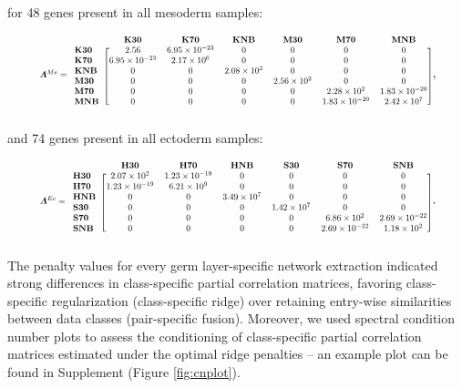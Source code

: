 \documentclass[
	a4paper, %
	10pt, %
	unnumberedsections, %
	twoside, %
]{LTJournalArticle}
\begin{document}
\noindent for 48 genes present in all mesoderm samples:

\[
\resizebox{0.9\columnwidth}{!}{
	$\bm{\varLambda}^{Me} = 
    \begin{blockarray}{l*{6}{c}}
     & \mathbf{K30} & \mathbf{K70} & \mathbf{KNB} & \mathbf{M30} & \mathbf{M70} & \mathbf{MNB} \\
    \begin{block}{l[cccccc]}
    \mathbf{K30} & 2.56 & 6.95 \times 10^{-23} & 0 & 0 & 0 & 0 \\
    \mathbf{K70} & 6.95 \times 10^{-23} & 2.17 \times 10^{6} & 0 & 0 & 0 & 0 \\
    \mathbf{KNB} & 0 & 0 & 2.08 \times 10^{2} & 0 & 0 & 0 \\
    \mathbf{M30} & 0 & 0 & 0 & 2.56 \times 10^{2} & 0 & 0 \\
    \mathbf{M70} & 0 & 0 & 0 & 0 & 2.28 \times 10^{2} & 1.83 \times 10^{-20} \\
    \mathbf{MNB} & 0 & 0 & 0 & 0 & 1.83 \times 10^{-20} & 2.42 \times 10^{7} \\
    \end{block}
    \end{blockarray}$},
\]

\noindent and 74 genes present in all ectoderm samples:

\[
\resizebox{0.9\columnwidth}{!}{
	$\bm{\varLambda}^{Ec} = 
    \begin{blockarray}{l*{6}{c}}
     & \mathbf{H30} & \mathbf{H70} & \mathbf{HNB} & \mathbf{S30} & \mathbf{S70} & \mathbf{SNB} \\
    \begin{block}{l[cccccc]}
    \mathbf{H30} & 2.07 \times 10^{2} & 1.23 \times 10^{-19} & 0 & 0 & 0 & 0 \\
    \mathbf{H70} & 1.23 \times 10^{-19} & 6.21 \times 10^9 & 0 & 0 & 0 & 0 \\
    \mathbf{HNB} & 0 & 0 & 3.49 \times 10^{7} & 0 & 0 & 0 \\
    \mathbf{S30} & 0 & 0 & 0 & 1.42 \times 10^{7} & 0 & 0 \\
    \mathbf{S70} & 0 & 0 & 0 & 0 & 6.86 \times 10^{2} & 2.69 \times 10^{-22} \\
    \mathbf{SNB} & 0 & 0 & 0 & 0 & 2.69 \times 10^{-22} & 1.18 \times 10^{2} \\
    \end{block}
    \end{blockarray}$}.
\]

\noindent The penalty values for every germ layer-specific network extraction 
indicated strong differences in class-specific partial correlation matrices, 
favoring 
class-specific regularization 
(class-specific ridge) over retaining entry-wise similarities between 
data classes (pair-specific fusion). 
Moreover,  we used spectral condition 
number plots  to assess the conditioning of class-specific partial 
correlation matrices estimated under 
the optimal ridge penalties – an example plot can be found 
in Supplement (Figure \ref{fig:cnplot}).
\end{document}
